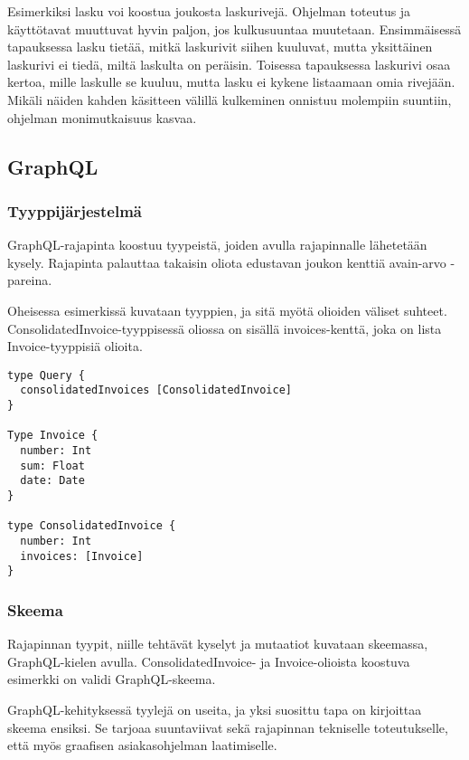 Esimerkiksi lasku voi koostua joukosta laskurivejä. Ohjelman toteutus ja
käyttötavat muuttuvat hyvin paljon, jos kulkusuuntaa muutetaan.
Ensimmäisessä tapauksessa lasku tietää, mitkä laskurivit siihen
kuuluvat, mutta yksittäinen laskurivi ei tiedä, miltä laskulta on
peräisin. Toisessa tapauksessa laskurivi osaa kertoa, mille laskulle se
kuuluu, mutta lasku ei kykene listaamaan omia rivejään. Mikäli näiden
kahden käsitteen välillä kulkeminen onnistuu molempiin suuntiin,
ohjelman monimutkaisuus kasvaa.

\hypertarget{graphql}{%
\subsection{GraphQL}\label{graphql}}

\hypertarget{tyyppijuxe4rjestelmuxe4}{%
\subsubsection{Tyyppijärjestelmä}\label{tyyppijuxe4rjestelmuxe4}}

GraphQL-rajapinta koostuu tyypeistä, joiden avulla rajapinnalle
lähetetään kysely. Rajapinta palauttaa takaisin oliota edustavan joukon
kenttiä avain-arvo -pareina. \cite{graphql:spec}

Oheisessa esimerkissä kuvataan tyyppien, ja sitä myötä olioiden väliset
suhteet. ConsolidatedInvoice-tyyppisessä oliossa on sisällä
invoices-kenttä, joka on lista Invoice-tyyppisiä olioita.

\begin{verbatim}
type Query {
  consolidatedInvoices [ConsolidatedInvoice]
}

Type Invoice {
  number: Int
  sum: Float
  date: Date
}

type ConsolidatedInvoice {
  number: Int
  invoices: [Invoice]
}
\end{verbatim}

\hypertarget{skeema}{%
\subsubsection{Skeema}\label{skeema}}

Rajapinnan tyypit, niille tehtävät kyselyt ja mutaatiot kuvataan
skeemassa, GraphQL-kielen avulla. ConsolidatedInvoice- ja
Invoice-olioista koostuva esimerkki on validi GraphQL-skeema.

GraphQL-kehityksessä tyylejä on useita, ja yksi suosittu tapa on
kirjoittaa skeema ensiksi. Se tarjoaa suuntaviivat sekä rajapinnan
tekniselle toteutukselle, että myös graafisen asiakasohjelman
laatimiselle.

